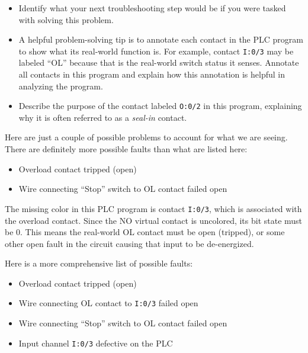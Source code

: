 \begin{itemize}
\item{} Identify what your next troubleshooting step would be if you were tasked with solving this problem.
\item{} A helpful problem-solving tip is to annotate each contact in the PLC program to show what its real-world function is.  For example, contact {\tt I:0/3} may be labeled ``OL'' because that is the real-world switch status it senses.  Annotate all contacts in this program and explain how this annotation is helpful in analyzing the program.
\item{} Describe the purpose of the contact labeled {\tt O:0/2} in this program, explaining why it is often referred to as a {\it seal-in} contact.
\end{itemize}







Here are just a couple of possible problems to account for what we are seeing.  There are definitely more possible faults than what are listed here:

\begin{itemize}
\item{} Overload contact tripped (open)
\item{} Wire connecting ``Stop'' switch to OL contact failed open
\end{itemize}







The missing color in this PLC program is contact {\tt I:0/3}, which is associated with the overload contact.  Since the NO virtual contact is uncolored, its bit state must be 0.  This means the real-world OL contact must be open (tripped), or some other open fault in the circuit causing that input to be de-energized.

\vskip 10pt

Here is a more comprehensive list of possible faults:

\begin{itemize}
\item{} Overload contact tripped (open)
\item{} Wire connecting OL contact to {\tt I:0/3} failed open
\item{} Wire connecting ``Stop'' switch to OL contact failed open
\item{} Input channel {\tt I:0/3} defective on the PLC
\end{itemize}





